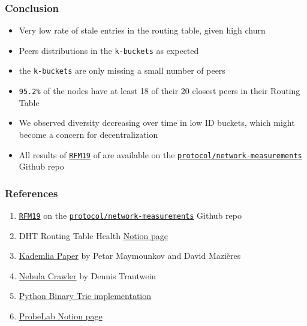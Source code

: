 \documentclass{pl-slide}
\begin{document}
\begin{frame}
\frametitle{Conclusion}
\begin{itemize}
	\item Very low rate of stale entries in the routing table, given high churn
	\item Peers distributions in the \texttt{k-buckets} as expected
	\item the \texttt{k-buckets} are only missing a small number of peers
	\item \texttt{95.2\%} of the nodes have at least 18 of their 20 closest peers in their Routing Table
	\item We observed diversity decreasing over time in low ID buckets, which might become a concern for decentralization
	\bigskip
	\item All results of \hyperlink{https://github.com/protocol/network-measurements/blob/rfm19/results/rfm19-dht-routing-table-health.md}{\texttt{RFM19}} of are available on the \hyperlink{https://github.com/protocol/network-measurements}{\texttt{protocol/network-measurements}} Github repo
\end{itemize}
\end{frame}

\begin{frame}
\frametitle{References}
\begin{enumerate}
	\item \hyperlink{https://github.com/protocol/network-measurements/blob/rfm19/results/rfm19-dht-routing-table-health.md}{\texttt{RFM19}} on the \hyperlink{https://github.com/protocol/network-measurements}{\texttt{protocol/network-measurements}} Github repo
	\item DHT Routing Table Health \hyperlink{https://www.notion.so/pl-strflt/DHT-Routing-Table-Health-f8e6836c4b09440baa909a4448a88fbf}{Notion page}
	\item \hyperlink{https://ipfs.io/ipfs/QmaVrnwZrnoG4YramcN75mbE5AUfCymiEErrHGXoQR968V}{Kademlia Paper} by Petar Maymounkov and David Mazières
	\item \hyperlink{https://github.com/dennis-tra/nebula-crawler}{Nebula Crawler} by Dennis Trautwein
	\item \hyperlink{https://github.com/guillaumemichel/py-binary-trie}{Python Binary Trie implementation}
	\item \hyperlink{https://www.notion.so/pl-strflt/ProbeLab-Protocol-Benchmarking-Optimization-a63238fd1b184d6f8fea4bb38d975208}{ProbeLab Notion page}
\end{enumerate}
\end{frame}
\end{document}
